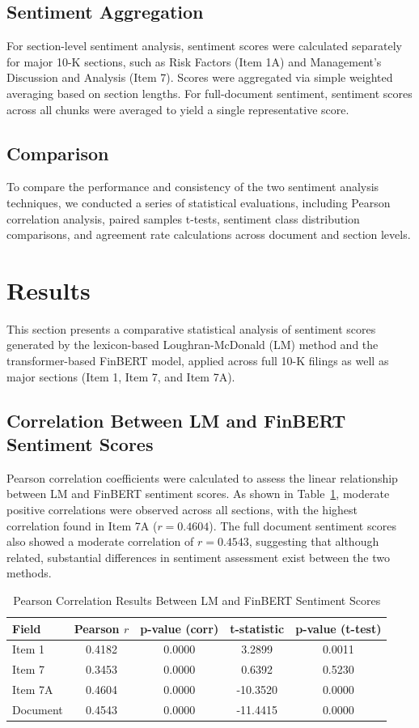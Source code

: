 \documentclass[12pt]{article}
\begin{document}
\subsection{Sentiment Aggregation}
For section-level sentiment analysis, sentiment scores were calculated separately for major 10-K sections, such as Risk Factors (Item 1A) and Management’s Discussion and Analysis (Item 7). Scores were aggregated via simple weighted averaging based on section lengths. For full-document sentiment, sentiment scores across all chunks were averaged to yield a single representative score.

\subsection{Comparison}
To compare the performance and consistency of the two sentiment analysis techniques, we conducted a series of statistical evaluations, including Pearson correlation analysis, paired samples t-tests, sentiment class distribution comparisons, and agreement rate calculations across document and section levels.

\section{Results}

This section presents a comparative statistical analysis of sentiment scores generated by the lexicon-based Loughran-McDonald (LM) method and the transformer-based FinBERT model, applied across full 10-K filings as well as major sections (Item 1, Item 7, and Item 7A).

\subsection{Correlation Between LM and FinBERT Sentiment Scores}

Pearson correlation coefficients were calculated to assess the linear relationship between LM and FinBERT sentiment scores. As shown in Table~\ref{tab:correlation_results}, moderate positive correlations were observed across all sections, with the highest correlation found in Item 7A ($r = 0.4604$). The full document sentiment scores also showed a moderate correlation of $r = 0.4543$, suggesting that although related, substantial differences in sentiment assessment exist between the two methods.

\begin{table}[H]
\centering
\caption{Pearson Correlation Results Between LM and FinBERT Sentiment Scores}
\label{tab:correlation_results}
\begin{tabular}{lcccc}
\hline
Field & Pearson $r$ & p-value (corr) & t-statistic & p-value (t-test) \\
\hline
Item 1 & 0.4182 & 0.0000 & 3.2899 & 0.0011 \\
Item 7 & 0.3453 & 0.0000 & 0.6392 & 0.5230 \\
Item 7A & 0.4604 & 0.0000 & -10.3520 & 0.0000 \\
Document & 0.4543 & 0.0000 & -11.4415 & 0.0000 \\
\hline
\end{tabular}
\end{table}
\end{document}

